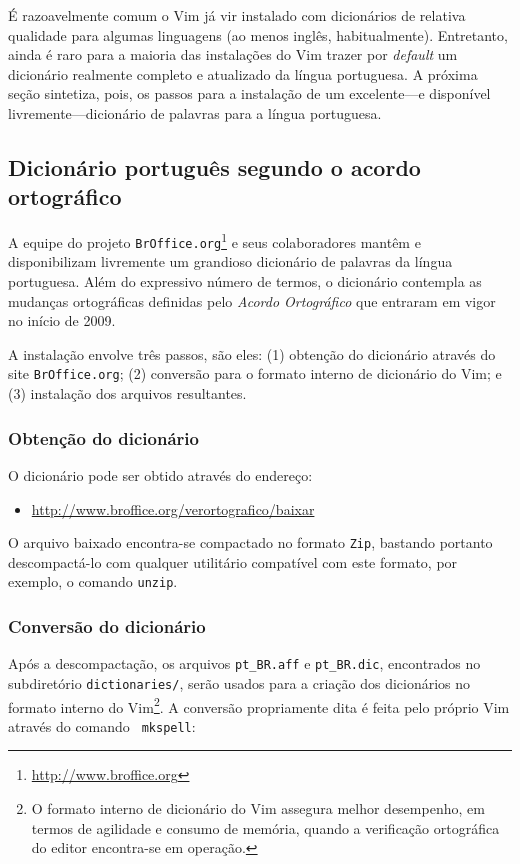 É razoavelmente comum o Vim já vir instalado com dicionários de relativa
qualidade para algumas linguagens (ao menos inglês, habitualmente).
Entretanto, ainda é raro para a maioria das instalações do Vim trazer por {\em
default} um dicionário realmente completo e atualizado da língua portuguesa. A
próxima seção sintetiza, pois, os passos para a instalação de um excelente---e
disponível livremente---dicionário de palavras para a língua portuguesa.

\subsection{Dicionário português segundo o acordo ortográfico}

A equipe do projeto {\tt BrOffice.org}\footnote{\url{http://www.broffice.org}}
e seus colaboradores mantêm e disponibilizam livremente um grandioso
dicionário de palavras da língua portuguesa. Além do expressivo número de
termos, o dicionário contempla as mudanças ortográficas definidas pelo
{\em Acordo Ortográfico} que entraram em vigor no início de 2009.

A instalação envolve três passos, são eles: (1) obtenção do dicionário
através do site {\tt BrOffice.org}; (2) conversão para o formato interno de
dicionário do Vim; e (3) instalação dos arquivos resultantes.

\subsubsection{Obtenção do dicionário}

O dicionário pode ser obtido através do endereço: 
\begin{itemize}
\item[] \url{http://www.broffice.org/verortografico/baixar}
\end{itemize}

O arquivo baixado encontra-se compactado no formato {\tt Zip}, bastando
portanto descompactá-lo com qualquer utilitário compatível com este formato,
por exemplo, o comando {\tt unzip}.

\subsubsection{Conversão do dicionário}

Após a descompactação, os arquivos \verb|pt_BR.aff| e \verb|pt_BR.dic|,
encontrados no subdiretório {\tt dictionaries/}, serão usados para a criação
dos dicionários no formato interno do Vim\footnote{O formato interno de dicionário
do Vim assegura melhor desempenho, em termos de agilidade e consumo de
memória, quando a verificação ortográfica do editor encontra-se em operação.}.
A conversão propriamente dita é feita pelo próprio Vim através do comando {\tt
mkspell}:

